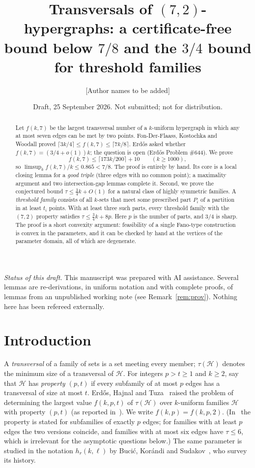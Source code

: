 \documentclass[11pt]{amsart}
\title[Transversals of $(7,2)$-hypergraphs]{Transversals of $(7,2)$-hypergraphs: a certificate-free bound below $7/8$ and the $3/4$ bound for threshold families}
\author{[Author names to be added]}
\date{Draft, 25 September 2026. Not submitted; not for distribution.}
\theoremstyle{definition}
\theoremstyle{remark}
\newcommand{\cH}{\mathcal H}
\newcommand{\ceil}[1]{\lceil #1\rceil}
\begin{document}
\begin{abstract}
Let $f(k,7)$ be the largest transversal number of a $k$-uniform hypergraph in which any at most seven edges can be met by two points. Fon-Der-Flaass, Kostochka and Woodall proved $\ceil{3k/4}\le f(k,7)\le\ceil{7k/8}$. Erd\H{o}s asked whether $f(k,7)=(3/4+o(1))k$; the question is open (Erd\H{o}s Problem \#644). We prove
\[
f(k,7)\le\ceil{173k/200}+10\qquad(k\ge1000),
\]
so $\limsup_k f(k,7)/k\le 0.865<7/8$. The proof is entirely by hand. Its core is a local closing lemma for a \emph{good triple} (three edges with no common point); a maximality argument and two intersection-gap lemmas complete it.
Second, we prove the conjectured bound $\tau\le\frac34k+O(1)$ for a natural class of highly symmetric families. A \emph{threshold family} consists of all $k$-sets that meet some prescribed part $P_i$ of a partition in at least $t_i$ points. With at least three such parts, every threshold family with the $(7,2)$ property satisfies $\tau\le\frac34k+8p$. Here $p$ is the number of parts, and $3/4$ is sharp. The proof is a short convexity argument: feasibility of a single Fano-type construction is convex in the parameters, and it can be checked by hand at the vertices of the parameter domain, all of which are degenerate.
\end{abstract}
\maketitle

\noindent\textit{Status of this draft.} This manuscript was prepared with AI assistance. Several lemmas are re-derivations, in uniform notation and with complete proofs, of lemmas from an unpublished working note (see Remark~\ref{rem:prov}). Nothing here has been refereed externally.

\section{Introduction}

A \emph{transversal} of a family of sets is a set meeting every member; $\tau(\cH)$ denotes the minimum size of a transversal of $\cH$. For integers $p>t\ge1$ and $k\ge2$, say that $\cH$ has \emph{property $(p,t)$} if every subfamily of at most $p$ edges has a transversal of size at most $t$. Erd\H{o}s, Hajnal and Tuza~\cite{EHT} raised the problem of determining the largest value $f(k,p,t)$ of $\tau(\cH)$ over $k$-uniform families $\cH$ with property $(p,t)$ (as reported in~\cite{FKW}). We write $f(k,p)=f(k,p,2)$. (In~\cite{FKW} the property is stated for subfamilies of exactly $p$ edges; for families with at least $p$ edges the two versions coincide, and families with at most six edges have $\tau\le6$, which is irrelevant for the asymptotic questions below.) The same parameter is studied in the notation $h_r(k,\ell)$ by Buci\'c, Kor\'andi and Sudakov~\cite{BKS}, who survey its history.
\end{document}
